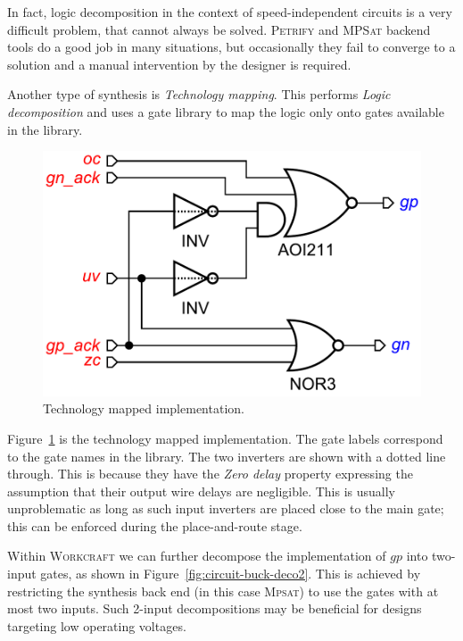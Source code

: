 \documentclass[british, journal]{IEEEtran}
\newcommand{\noun}[1]{\textsc{#1}}
\begin{document}
In fact, logic decomposition in the context of speed-independent circuits is a very difficult problem,
that cannot always be solved. \noun{Petrify} and \noun{MPSat} backend tools do a good job in many situations,
but occasionally they fail to converge to a solution and a manual intervention by the designer is required.

Another type of synthesis is \emph{Technology mapping}. This performs \emph{Logic decomposition} and uses a gate library to map the logic only onto gates available in the library.

\begin{figure}[h]
\begin{centering}
\includegraphics[scale=0.35]{Images/circuit-buck-mapped-pfy-wc.pdf}
\par\end{centering}

\protect\caption{\label{fig:tech-mapped-circuit}Technology mapped implementation.}
\end{figure}

Figure~\ref{fig:tech-mapped-circuit} is the technology mapped implementation.
The gate labels correspond to the gate names in the library.
The two inverters are shown with a dotted line through.
This is because they have the \emph{Zero delay} property expressing the assumption that their output wire delays are negligible.
This is usually unproblematic as long as such input inverters are placed close to the main gate;
this can be enforced during the place-and-route stage.

Within \noun{Workcraft} we can further decompose the implementation of $gp$ into two-input gates,
as shown in Figure~\ref{fig:circuit-buck-deco2}. This is achieved by restricting the synthesis
back end (in this case \noun{Mpsat}) to use the gates with at most two inputs.
Such 2-input decompositions may be beneficial for designs targeting low
operating voltages.
\end{document}
